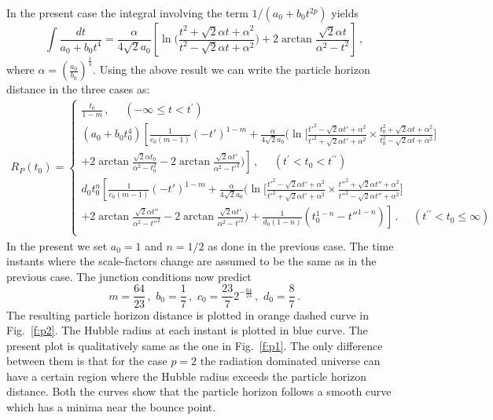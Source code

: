 \documentclass[24pt]{article}
\begin{document}
In the present case the integral involving the term $1/(a_0 + b_0 t^{2p})$
yields\cite{grad}
$$\int\frac{dt}{a_0+b_0 t^4}=\frac{\alpha}{4 \sqrt{2}a_0}\left[\ln
  \Big(\frac{t^2 + \sqrt{2} \alpha t + \alpha^2}{t^2 - \sqrt{2} \alpha
    t + \alpha^2}\Big)+2 \arctan \frac{\sqrt{2}\alpha t}{\alpha^2 -
    t^2}\right]\,,$$ where $\alpha=(\frac{a_0}{b_0})^{\frac{1}{4}}$.
Using the above result we can write the particle horizon distance in
the three cases as:
\begin{eqnarray}
R_P(t_0)=\left\{
\begin{array}{ll}
\frac{t_0}{1-m}\,,\,\,\,\,\,\,\,\,(-\infty \le t < t^\prime)\\
(a_0 +  b_0 t_0^4)\left[\frac{1}{c_0(m-1)}(-t')^{1-m} +\frac{ \alpha}{
  4 \sqrt{2}a_0} \Big(\ln \Big[\frac{t'^2 - \sqrt{2} \alpha t' + \alpha^2}{
      t'^2 + \sqrt{2} \alpha t' + \alpha^2} \times \frac{
      t_0^2 + \sqrt{2} \alpha t + \alpha^2}{
      t_0^2 - \sqrt{2} \alpha t + \alpha^2}\Big]\right.\\
   \left. + 2 \arctan\frac{\sqrt{2} \alpha t_0}{\alpha^2 - t_0^2} - 
   2 \arctan\frac{\sqrt{2} \alpha t'}{\alpha^2 - t'^2}\Big)\right]\,,\,\,\,\,\,\,\,\,
(t^{\prime } < t_0 < t^{\prime \prime})\\
d_0 t_0^n \left[\frac{1}{c_0(m-1)}(-t')^{1-m}  +\frac{ \alpha}{
  4 \sqrt{2}a_0} \Big(\ln\Big[\frac{t'^2 - \sqrt{2} \alpha t' + \alpha^2}{
      t'^2 + \sqrt{2} \alpha t' + \alpha^2} \times \frac{
      t''^2 + \sqrt{2} \alpha t'' + \alpha^2}{
      t''^2 - \sqrt{2} \alpha t'' + \alpha^2}\Big]\right. \\
\left. + 2 \arctan\frac{\sqrt{2} \alpha t''}{\alpha^2 - t''^2} - 
2 \arctan\frac{\sqrt{2} \alpha t'}{\alpha^2 - t'^2}\Big)+
\frac{1}{d_0(1-n)}(t_0^{1-n}-t''^{1-n})
\right]\,.\,\,\,\,\,\,\,\,(t^{\prime \prime} < t_0 \le \infty)\\
\end{array}
\right.
\end{eqnarray}
In the present we set $a_0=1$ and $n=1/2$ as done in the previous
case.  The time instants where the scale-factors change are assumed to
be the same as in the previous case. The junction conditions now
predict
$$m=\frac{64}{23}\,,\,\,b_0=\frac{1}{7}\,,\,\,c_0=\frac{23}{7}2^{-\frac{64}{23}}\,,\,\,
d_0=\frac{8}{7}\,.$$ The resulting particle horizon distance is
plotted in orange dashed curve in Fig.~\ref{f:p2}. The Hubble radius
at each instant is plotted in blue curve. The present plot is
qualitatively same as the one in Fig.~\ref{f:p1}. The only difference
between them is that for the case $p=2$ the radiation dominated
universe can have a certain region where the Hubble radius exceeds
the particle horizon distance.  Both the curves show that the particle
horizon follows a smooth curve which has a minima near the bounce
point. 
\end{document}
